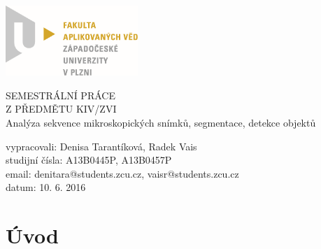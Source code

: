 \documentclass[12pt, a4paper]{report}
\begin{document}
	\begin{titlepage}
	\includegraphics[width=5cm,natwidth=601,natheight=314]{logo.png}
		
	\vspace{4cm}
		\begin {center}
		{\Huge SEMESTRÁLNÍ PRÁCE\\ Z PŘEDMĚTU KIV/ZVI\\}
		{\huge Analýza sekvence mikroskopických snímků, segmentace, detekce objektů\\}
		\end {center}
	\vspace{7cm}
			
	\noindent vypracovali: Denisa Tarantíková, Radek Vais \\
				studijní čísla: A13B0445P, A13B0457P\\
				email:	denitara@students.zcu.cz, vaisr@students.zcu.cz\\
				datum:	10. 6. 2016
	\end{titlepage}

\tableofcontents
\chapter{Úvod}
	
\end{document}
